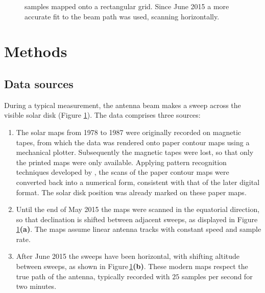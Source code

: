 \documentclass{aa}
\begin{document}
\begin{figure}
{    samples mapped onto a rectangular grid.
    Since June 2015 a more accurate fit to the beam path was used, scanning 
    horizontally.
  \label{oldmap}\label{typicalmap}}
  \end{figure}
\section{Methods}\label{sect:methods}

\subsection{Data sources}\label{sect:source}

  During a typical measurement, the antenna beam makes a sweep across the
  visible solar disk (Figure \ref{typicalmap}).
  The data comprises three sources:
  \begin{enumerate}[A]
    \item
    The solar maps from 1978 to 1987 were originally recorded on magnetic
    tapes, from which the data was rendered onto paper contour maps using a
    mechanical plotter.
    Subsequently the magnetic tapes were lost, so that only the printed maps
    were only available. 
    Applying pattern recognition techniques developed by
    \cite{masterthesis}, the scans of the paper contour maps were converted
    back into a numerical form, consistent with that of the later 
    digital format.
    The solar disk position was already marked on these paper maps.
    \item
    Until the end of May 2015 the maps were scanned in the equatorial direction,
    so that declination is shifted between adjacent sweeps, as displayed in
    Figure\,\ref{typicalmap}{\bf(a)}.
    The maps assume linear antenna tracks with constant speed and sample rate.
    \item
    After June 2015 the sweeps have been horizontal, with shifting altitude
    between sweeps, as shown in Figure\,\ref{typicalmap}{\bf(b)}.
    These modern maps respect the true path of the antenna, typically recorded
    with $25$ samples per second for two minutes.
  \end{enumerate}
\end{document}
